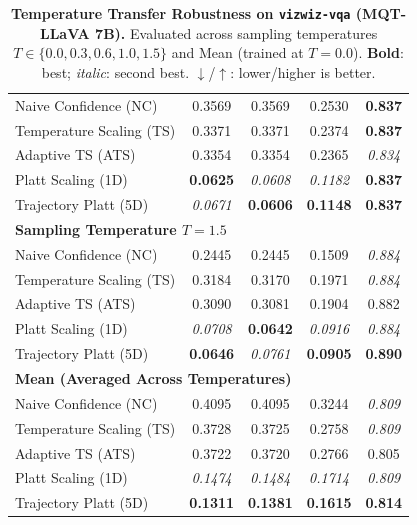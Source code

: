 \begin{table}[t]
{\begin{tabular}{lcccc}
\midrule
Naive Confidence (NC) & 0.3569 & 0.3569 & 0.2530 & \textbf{0.837} \\
Temperature Scaling (TS) & 0.3371 & 0.3371 & 0.2374 & \textbf{0.837} \\
Adaptive TS (ATS) & 0.3354 & 0.3354 & 0.2365 & \textit{0.834} \\
Platt Scaling (1D) & \textbf{0.0625} & \textit{0.0608} & \textit{0.1182} & \textbf{0.837} \\
Trajectory Platt (5D) & \textit{0.0671} & \textbf{0.0606} & \textbf{0.1148} & \textbf{0.837} \\
\midrule
\multicolumn{5}{l}{\textbf{Sampling Temperature $T = 1.5$}} \\
\midrule
Naive Confidence (NC) & 0.2445 & 0.2445 & 0.1509 & \textit{0.884} \\
Temperature Scaling (TS) & 0.3184 & 0.3170 & 0.1971 & \textit{0.884} \\
Adaptive TS (ATS) & 0.3090 & 0.3081 & 0.1904 & 0.882 \\
Platt Scaling (1D) & \textit{0.0708} & \textbf{0.0642} & \textit{0.0916} & \textit{0.884} \\
Trajectory Platt (5D) & \textbf{0.0646} & \textit{0.0761} & \textbf{0.0905} & \textbf{0.890} \\
\midrule
\multicolumn{5}{l}{\textbf{Mean (Averaged Across Temperatures)}} \\
\midrule
Naive Confidence (NC) & 0.4095 & 0.4095 & 0.3244 & \textit{0.809} \\
Temperature Scaling (TS) & 0.3728 & 0.3725 & 0.2758 & \textit{0.809} \\
Adaptive TS (ATS) & 0.3722 & 0.3720 & 0.2766 & 0.805 \\
Platt Scaling (1D) & \textit{0.1474} & \textit{0.1484} & \textit{0.1714} & \textit{0.809} \\
Trajectory Platt (5D) & \textbf{0.1311} & \textbf{0.1381} & \textbf{0.1615} & \textbf{0.814} \\
\bottomrule
\end{tabular}%
}
\caption{\textbf{Temperature Transfer Robustness on \texttt{vizwiz-vqa} (MQT-LLaVA 7B).} Evaluated across sampling temperatures $T \in \{0.0, 0.3, 0.6, 1.0, 1.5\}$ and Mean (trained at $T=0.0$). \textbf{Bold}: best; \textit{italic}: second best. $\downarrow$/$\uparrow$: lower/higher is better.}
\label{tab:temp_transfer_mqt_vizwizvqa}
\end{table}
